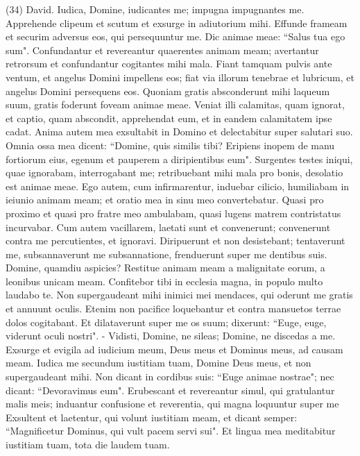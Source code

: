 \begin{biblechapter}  (34) 
\verse David. Iudica, Domine, iudicantes me; impugna impugnantes me. 
\verse Apprehende clipeum et scutum et exsurge in adiutorium mihi. 
\verse Effunde frameam et securim adversus eos, qui persequuntur me. Dic animae meae: “Salus tua ego sum". 
\verse Confundantur et revereantur quaerentes animam meam; avertantur retrorsum et confundantur cogitantes mihi mala. 
\verse Fiant tamquam pulvis ante ventum, et angelus Domini impellens eos; 
\verse fiat via illorum tenebrae et lubricum, et angelus Domini persequens eos. 
\verse Quoniam gratis absconderunt mihi laqueum suum, gratis foderunt foveam animae meae. 
\verse Veniat illi calamitas, quam ignorat, et captio, quam abscondit, apprehendat eum, et in eandem calamitatem ipse cadat. 
\verse Anima autem mea exsultabit in Domino et delectabitur super salutari suo. 
\verse Omnia ossa mea dicent: “Domine, quis similis tibi? Eripiens inopem de manu fortiorum eius, egenum et pauperem a diripientibus eum". 
\verse Surgentes testes iniqui, quae ignorabam, interrogabant me; 
\verse retribuebant mihi mala pro bonis, desolatio est animae meae. 
\verse Ego autem, cum infirmarentur, induebar cilicio, humiliabam in ieiunio animam meam; et oratio mea in sinu meo convertebatur. 
\verse Quasi pro proximo et quasi pro fratre meo ambulabam, quasi lugens matrem contristatus incurvabar. 
\verse Cum autem vacillarem, laetati sunt et convenerunt; convenerunt contra me percutientes, et ignoravi. 
\verse Diripuerunt et non desistebant; tentaverunt me, subsannaverunt me subsannatione, frenduerunt super me dentibus suis. 
\verse Domine, quamdiu aspicies? Restitue animam meam a malignitate eorum, a leonibus unicam meam. 
\verse Confitebor tibi in ecclesia magna, in populo multo laudabo te. 
\verse Non supergaudeant mihi inimici mei mendaces, qui oderunt me gratis et annuunt oculis. 
\verse Etenim non pacifice loquebantur et contra mansuetos terrae dolos cogitabant. 
\verse Et dilataverunt super me os suum; dixerunt: “Euge, euge, viderunt oculi nostri". - 
\verse Vidisti, Domine, ne sileas; Domine, ne discedas a me. 
\verse Exsurge et evigila ad iudicium meum, Deus meus et Dominus meus, ad causam meam. 
\verse Iudica me secundum iustitiam tuam, Domine Deus meus, et non supergaudeant mihi. 
\verse Non dicant in cordibus suis: “Euge animae nostrae"; nec dicant: “Devoravimus eum". 
\verse Erubescant et revereantur simul, qui gratulantur malis meis; induantur confusione et reverentia, qui magna loquuntur super me 
\verse Exsultent et laetentur, qui volunt iustitiam meam, et dicant semper: “Magnificetur Dominus, qui vult pacem servi sui". 
\verse Et lingua mea meditabitur iustitiam tuam, tota die laudem tuam. 
\end{biblechapter}

